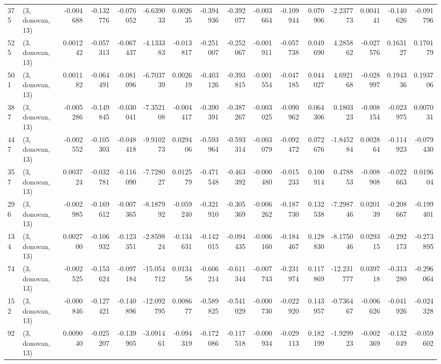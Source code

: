 \begin{tabular}{llrrrrrrrrrrrrrr}
375 &  (3, donovan, 13) &  -0.004688 & -0.132776 & -0.076052 &   -6.639033 &  0.002635 &  -0.394936 & -0.392077 & -0.003664 & -0.109944 &  0.070906 &   -2.237773 &  0.004141 & -0.140626 & -0.091796 \\
525 &  (3, donovan, 13) &   0.001242 & -0.057313 & -0.067437 &   -4.133383 & -0.013817 &  -0.251007 & -0.252067 & -0.001911 & -0.057738 &  0.049690 &    4.285862 & -0.027576 &  0.163127 &  0.170179 \\
501 &  (3, donovan, 13) &   0.001182 & -0.064491 & -0.081096 &   -6.703739 &  0.002619 &  -0.403126 & -0.393815 & -0.001554 & -0.047185 &  0.044027 &    4.692168 & -0.028997 &  0.194336 &  0.193706 \\
387 &  (3, donovan, 13) &  -0.005286 & -0.149845 & -0.030041 &   -7.352108 & -0.004417 &  -0.390391 & -0.387267 & -0.003025 & -0.090962 &  0.064306 &    0.180323 & -0.008154 & -0.023975 &  0.007031 \\
447 &  (3, donovan, 13) &  -0.002552 & -0.105303 & -0.048418 &   -9.910273 &  0.029406 &  -0.593964 & -0.593314 & -0.003079 & -0.092472 &  0.072676 &   -1.845284 &  0.002864 & -0.114923 & -0.079430 \\
357 &  (3, donovan, 13) &   0.003724 & -0.032781 & -0.116090 &   -7.728027 &  0.012579 &  -0.471548 & -0.463392 & -0.000480 & -0.015233 &  0.100914 &    0.478853 & -0.008908 & -0.022663 &  0.019604 \\
296 &  (3, donovan, 13) &  -0.002985 & -0.169612 & -0.007365 &   -8.187992 & -0.059240 &  -0.321910 & -0.305369 & -0.006262 & -0.187730 &  0.132538 &   -7.298746 &  0.020139 & -0.208667 & -0.199401 \\
134 &  (3, donovan, 13) &   0.002700 & -0.106932 & -0.123351 &   -2.859824 & -0.134631 &  -0.142015 & -0.094435 & -0.006160 & -0.184467 &  0.128830 &   -8.175046 &  0.029315 & -0.292173 & -0.273895 \\
74  &  (3, donovan, 13) &  -0.002525 & -0.153624 & -0.097184 &  -15.054712 &  0.013458 &  -0.606214 & -0.611344 & -0.007743 & -0.231974 &  0.117869 &  -12.231777 &  0.039718 & -0.313280 & -0.296064 \\
152 &  (3, donovan, 13) &  -0.000846 & -0.127421 & -0.140896 &  -12.092795 &  0.008677 &  -0.589825 & -0.541029 & -0.000730 & -0.022920 &  0.143957 &   -0.736467 & -0.006626 & -0.041926 & -0.024328 \\
92  &  (3, donovan, 13) &   0.009040 & -0.025207 & -0.139905 &   -3.091461 & -0.094319 &  -0.172086 & -0.117518 & -0.000934 & -0.029113 &  0.182199 &   -1.929923 & -0.002369 & -0.132049 & -0.059602 \\

\end{tabular}
